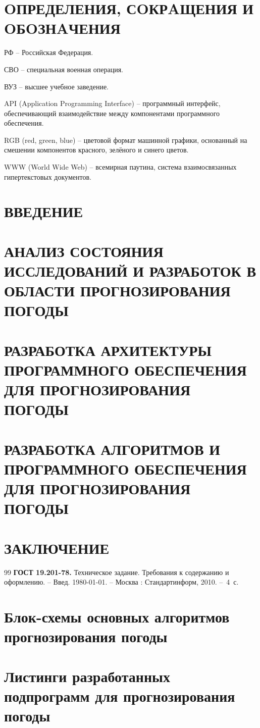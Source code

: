 \documentclass[14pt]{extarticle}
\begin{document}
\initpagenumbering

\section*{OПРЕДЕЛЕНИЯ, СOКРAЩЕНИЯ И OБOЗНAЧЕНИЯ}
\par РФ -- Российская Федерация.
\par СВО -- специальная военная операция.
\par ВУЗ -- высшее учебное заведение.
\par API (Application Programming Interface) -- программный интерфейс, обеспечивающий взаимодействие между компонентами программного обеспечения.
\par RGB (red, green, blue) -- цветовой формат машинной графики, основанный на смешении компонентов красного, зелёного и синего цветов.
\par WWW (World Wide Web) -- всемирная паутина, система взаимосвязанных гипертекстовых документов.

\renewcommand{\contentsname}{\rucontentsname}
\tableofcontents

\section*[ВВЕДЕНИЕ]{ВВЕДЕНИЕ}
\lipsum[1-10]
\section{АНАЛИЗ СОСТОЯНИЯ ИССЛЕДОВАНИЙ И РАЗРАБОТОК В ОБЛАСТИ ПРОГНОЗИРОВАНИЯ ПОГОДЫ}
\lipsum[11-20]
\section{РАЗРАБОТКА АРХИТЕКТУРЫ ПРОГРАММНОГО ОБЕСПЕЧЕНИЯ ДЛЯ ПРОГНОЗИРОВАНИЯ ПОГОДЫ}
\lipsum[21-30]
\section{РАЗРАБОТКА АЛГОРИТМОВ И ПРОГРАММНОГО ОБЕСПЕЧЕНИЯ ДЛЯ ПРОГНОЗИРОВАНИЯ ПОГОДЫ}
\lipsum[31-40]
\section*[ЗАКЛЮЧЕНИЕ]{ЗАКЛЮЧЕНИЕ}
\lipsum[41-50]

\newpage
\renewcommand{\refname}{\rubibliographyname} %
{}%
\begin{thebibliography}{99}
	\textbf{ГОСТ 19.201-78.} Техническое задание. Требования к содержанию и оформлению.  -- Введ. 1980-01-01. -- Москва : Стандартинформ, 2010. --~4~с.
\end{thebibliography}

\appendix

\section{Блок-схемы основных алгоритмов прогнозирования погоды}
\lipsum[1-10]
\section{Листинги разработанных подпрограмм для прогнозирования погоды}
\lipsum[11-20]
\end{document}
